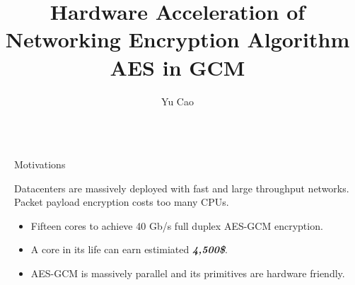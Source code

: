 \documentclass[final]{beamer}
\title{Hardware Acceleration of Networking Encryption Algorithm AES in GCM } %
\author{Yu Cao\inst{1}} %
\institute{$^1$New York University} %
\newlength{\sepwid}
\newlength{\onecolwid}
\begin{document}

\setlength{\belowcaptionskip}{2ex} %
\setlength\belowdisplayshortskip{2ex} %

\begin{frame}[t] %

\begin{columns}[t] %

\begin{column}{\sepwid}\end{column} %

\begin{column}{\onecolwid} %


\begin{alertblock}{Motivations}

Datacenters are massively deployed with fast and large throughput networks. Packet payload encryption costs too many CPUs. 
\begin{itemize}
\item Fifteen cores to achieve 40 Gb/s full duplex AES-GCM encryption.
\item A core in its life can earn estimiated \textbf{\emph{4,500\$}}.
\item AES-GCM is massively parallel and its primitives are hardware friendly.
\end{itemize}

\end{alertblock}



\end{column}
\end{columns}
\end{frame}
\end{document}
